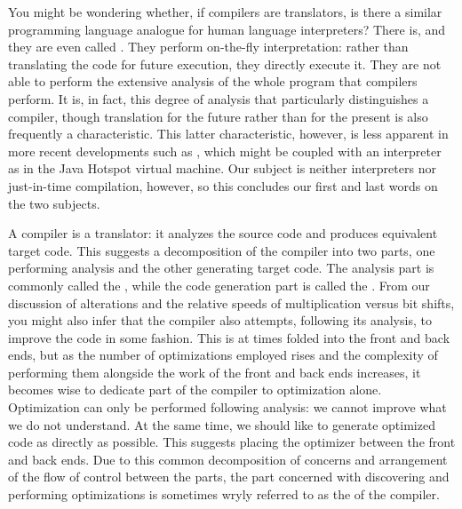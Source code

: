 You might be wondering whether, if compilers are translators, is there a similar programming language analogue for human language interpreters? There is, and they are even called . They perform on-the-fly interpretation: rather than translating the code for future execution, they directly execute it. They are not able to perform the extensive analysis of the whole program that compilers perform. It is, in fact, this degree of analysis that particularly distinguishes a compiler, though translation for the future rather than for the present is also frequently a characteristic. This latter characteristic, however, is less apparent in more recent developments such as , which might be coupled with an interpreter as in the Java Hotspot virtual machine. Our subject is neither interpreters nor just-in-time compilation, however, so this concludes our first and last words on the two subjects.

A compiler is a translator: it analyzes the source code and produces equivalent target code. This suggests a decomposition of the compiler into two parts, one performing analysis and the other generating target code. The analysis part is commonly called the , while the code generation part is called the . From our discussion of alterations and the relative speeds of multiplication versus bit shifts, you might also infer that the compiler also attempts, following its analysis, to improve the code in some fashion. This  is at times folded into the front and back ends, but as the number of optimizations employed rises and the complexity of performing them alongside the work of the front and back ends increases, it becomes wise to dedicate part of the compiler to optimization alone. Optimization can only be performed following analysis: we cannot improve what we do not understand. At the same time, we should like to generate optimized code as directly as possible. This suggests placing the optimizer between the front and back ends. Due to this common decomposition of concerns and arrangement of the flow of control between the parts, the part concerned with discovering and performing optimizations is sometimes wryly referred to as the  of the compiler.

